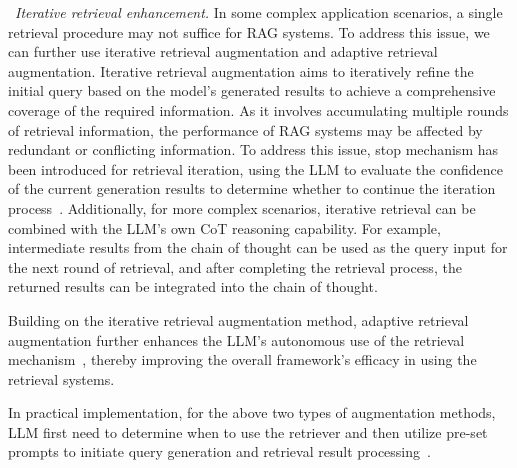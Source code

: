 \textbullet~\emph{Iterative retrieval enhancement.} In some complex application scenarios,  a single retrieval procedure may not suffice for RAG systems. To address this issue, we can further use iterative retrieval augmentation and adaptive retrieval augmentation. Iterative retrieval augmentation aims to iteratively refine the initial query based on the model's generated results to achieve a comprehensive coverage of the required information. As it involves accumulating multiple rounds of retrieval information, the performance of RAG systems may be affected by redundant or conflicting information. To address this issue, stop mechanism has been introduced for retrieval iteration, using the LLM to evaluate the confidence of the current generation results to determine whether to continue the iteration process~\cite{Jiang-2023-arxiv-Active}. Additionally, for more complex scenarios, iterative retrieval can be combined with the LLM's own CoT reasoning capability. For example, intermediate results from the chain of thought can be used as the query input for the next round of retrieval, and after completing the retrieval process, the returned results can be integrated into the chain of thought. 

Building on the iterative retrieval augmentation method, adaptive retrieval augmentation further enhances the LLM's autonomous use of the retrieval mechanism~\cite{xu2024sayself}, thereby improving the overall framework's efficacy in using the retrieval systems. 

{In practical implementation, for the above two types of augmentation methods,  LLM first need to determine when to use the retriever and then utilize pre-set prompts to initiate query generation and retrieval result processing~\cite{asai2023self}.}

